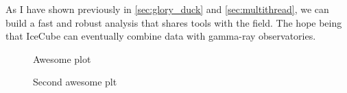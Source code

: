 As I have shown previously in \cref{sec:glory_duck} and \cref{sec:multithread}, we can build a fast and robust analysis that shares tools with the field.
The hope being that IceCube can eventually combine data with gamma-ray observatories.

\begin{figure}
    \caption{Awesome plot}
    \label{fig:nuDuck_sens}
\end{figure}

\begin{figure}
    \caption{Second awesome plt}
    \label{fig:nuDuck_mockdata}
\end{figure}
